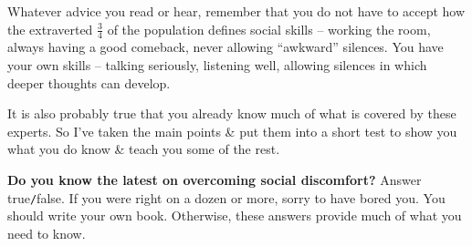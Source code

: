 \documentclass{article}
\numberwithin{equation}{section}
\begin{document}
Whatever advice you read or hear, remember that you do not have to accept how the extraverted $\frac{3}{4}$ of the population defines social skills -- working the room, always having a good comeback, never allowing ``awkward'' silences. You have your own skills -- talking seriously, listening well, allowing silences in which deeper thoughts can develop.

It is also probably true that you already know much of what is covered by these experts. So I've taken the main points \& put them into a short test to show you what you do know \& teach you some of the rest.

\textbf{Do you know the latest on overcoming social discomfort?} Answer true{\tt/}false. If you were right on a dozen or more, sorry to have bored you. You should write your own book. Otherwise, these answers provide much of what you need to know.
\end{document}
